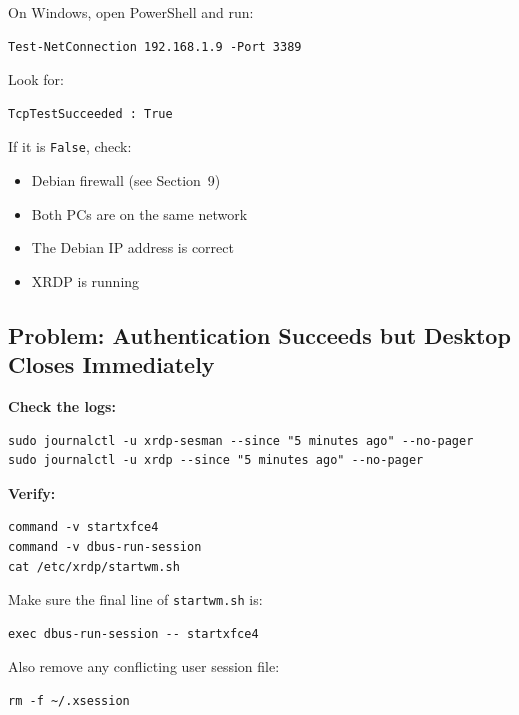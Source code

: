 \documentclass[a4paper,12pt]{article}
\newcommand{\code}[1]{\texttt{\small #1}}
\begin{document}
On Windows, open PowerShell and run:

\begin{lstlisting}[style=bashstyle]
Test-NetConnection 192.168.1.9 -Port 3389
\end{lstlisting}

Look for:

\begin{lstlisting}[style=textstyle]
TcpTestSucceeded : True
\end{lstlisting}

If it is \code{False}, check:

\begin{itemize}[leftmargin=2em]
    \item Debian firewall (see Section~9)
    \item Both PCs are on the same network
    \item The Debian IP address is correct
    \item XRDP is running
\end{itemize}

\subsection{Problem: Authentication Succeeds but Desktop Closes Immediately}

\textbf{Check the logs:}

\begin{lstlisting}[style=bashstyle]
sudo journalctl -u xrdp-sesman --since "5 minutes ago" --no-pager
sudo journalctl -u xrdp --since "5 minutes ago" --no-pager
\end{lstlisting}

\textbf{Verify:}

\begin{lstlisting}[style=bashstyle]
command -v startxfce4
command -v dbus-run-session
cat /etc/xrdp/startwm.sh
\end{lstlisting}

Make sure the final line of \code{startwm.sh} is:

\begin{lstlisting}[style=shstyle]
exec dbus-run-session -- startxfce4
\end{lstlisting}

Also remove any conflicting user session file:

\begin{lstlisting}[style=bashstyle]
rm -f ~/.xsession
\end{lstlisting}
\end{document}
